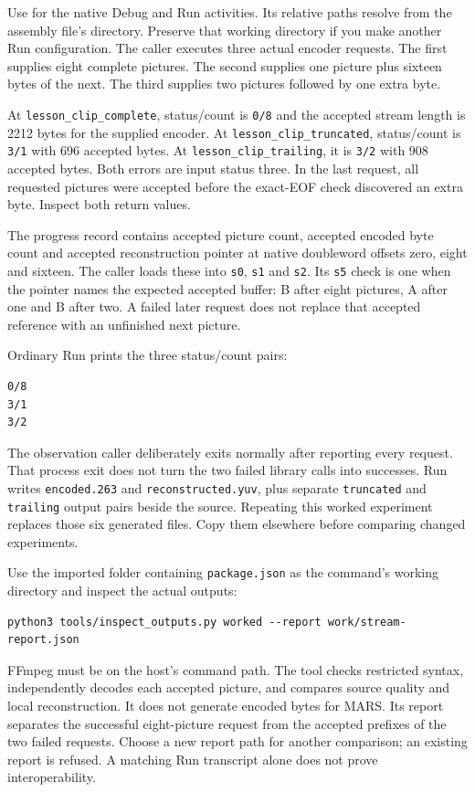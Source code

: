Use  for the native Debug and Run activities.
Its relative paths resolve from the assembly file's directory. Preserve that
working directory if you make another Run configuration. The caller executes
three actual encoder requests. The first supplies eight complete pictures. The
second supplies one picture plus sixteen bytes of the next. The third supplies
two pictures followed by one extra byte.

At \texttt{lesson\_clip\_complete}, status/count is \texttt{0/8} and the
accepted stream length is 2212 bytes for the supplied encoder. At
\texttt{lesson\_clip\_truncated}, status/count is \texttt{3/1} with 696
accepted bytes. At \texttt{lesson\_clip\_trailing}, it is \texttt{3/2}
with 908 accepted bytes. Both errors are input status three. In the last request,
all requested pictures were accepted before the exact-EOF check discovered an
extra byte. Inspect both return values.

The progress record contains accepted picture count, accepted encoded byte count
and accepted reconstruction pointer at native doubleword offsets zero, eight and
sixteen. The caller loads these into \texttt{s0}, \texttt{s1} and \texttt{s2}.
Its \texttt{s5} check is one when the pointer names the expected accepted buffer:
B after eight pictures, A after one and B after two. A failed later request does
not replace that accepted reference with an unfinished next picture.



Ordinary Run prints the three status/count pairs:
\begin{Verbatim}
0/8
3/1
3/2
\end{Verbatim}
The observation caller deliberately exits normally after reporting every request.
That process exit does not turn the two failed library calls into successes.
Run writes \texttt{encoded.263} and \texttt{reconstructed.yuv}, plus separate
\texttt{truncated} and \texttt{trailing} output pairs beside the source. Repeating
this worked experiment replaces those six generated files. Copy them elsewhere
before comparing changed experiments.

Use the imported folder containing \texttt{package.json} as the command's working
directory and inspect the actual outputs:
\begin{Verbatim}
python3 tools/inspect_outputs.py worked --report work/stream-report.json
\end{Verbatim}
FFmpeg must be on the host's command path. The tool checks restricted syntax,
independently decodes each accepted picture, and compares source quality and local
reconstruction. It does not generate encoded bytes for MARS. Its report separates
the successful eight-picture request from the accepted prefixes of the two failed
requests. Choose a new report path for another comparison; an existing report is
refused. A matching Run transcript alone does not prove interoperability.

